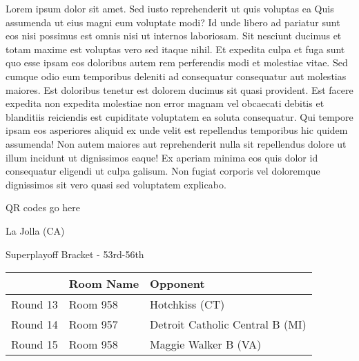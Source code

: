 \documentclass{article}%
\begin{document}
\vspace*{8pt}%
\linebreak%
\newline%
\newline%
Lorem ipsum dolor sit amet. Sed iusto reprehenderit ut quis voluptas ea Quis assumenda ut eius magni eum voluptate modi? Id unde libero ad pariatur sunt eos nisi possimus est omnis nisi ut internos laboriosam. Sit nesciunt ducimus et totam maxime est voluptas vero sed itaque nihil. Et expedita culpa et fuga sunt quo esse ipsam eos doloribus autem rem perferendis modi et molestiae vitae.\newline%
\newline%
Sed cumque odio eum temporibus deleniti ad consequatur consequatur aut molestias maiores. Est doloribus tenetur est dolorem ducimus sit quasi provident. Est facere expedita non expedita molestiae non error magnam vel obcaecati debitis et blanditiis reiciendis est cupiditate voluptatem ea soluta consequatur. Qui tempore ipsam eos asperiores aliquid ex unde velit est repellendus temporibus hic quidem assumenda!\newline%
\newline%
Non autem maiores aut reprehenderit nulla sit repellendus dolore ut illum incidunt ut dignissimos eaque! Ex aperiam minima eos quis dolor id consequatur eligendi ut culpa galisum. Non fugiat corporis vel doloremque dignissimos sit vero quasi sed voluptatem explicabo.\newline%
\newline%
%
\vspace*{30pt}%
\begin{center}%
\begin{Huge}%
QR codes go here%
\end{Huge}%
\end{center}%
\newpage%
\begin{center}%
\begin{Huge}%
La Jolla (CA)%
\end{Huge}%
\vspace*{8pt}%
\linebreak%
\begin{Large}%
Superplayoff Bracket {-} 53rd{-}56th%
\end{Large}%
\end{center}%
%
\begin{tabularx}{\textwidth}{|c|Y|Y|}%
\hline%
&Room Name&Opponent\\%
\hline%
Round 13&Room 958&Hotchkiss (CT)\\%
Round 14&Room 957&Detroit Catholic Central B (MI)\\%
Round 15&Room 958&Maggie Walker B (VA)\\%
\hline%
\end{tabularx}%
\end{document}
